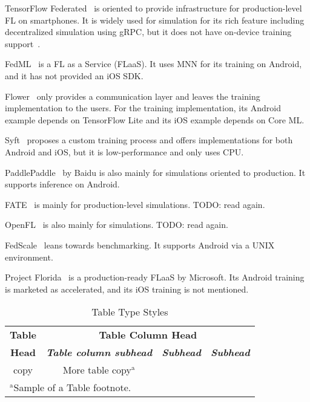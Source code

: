 \documentclass[conference]{IEEEtran}
\begin{document}
TensorFlow Federated~\cite{tensorflow2015-whitepaper} is oriented to
provide infrastructure for production-level FL on smartphones.
It is widely used for simulation for its rich feature including
decentralized simulation using gRPC,
but it does not have on-device training support~\cite{kholod2020open}.

FedML~\cite{he2020fedml} is a FL as a Service (FLaaS).
It uses MNN for its training on Android,
and it has not provided an iOS SDK.

Flower~\cite{beutel2020flower,mathur2021ondevice}
only provides a communication layer and
leaves the training implementation to the users.
For the training implementation,
its Android example depends on TensorFlow Lite and
its iOS example depends on Core ML.

Syft~\cite{ryffel2018generic,Ziller2021,hall2021syft}
proposes a custom training process and
offers implementations for both Android and iOS,
but it is low-performance and only uses CPU.

PaddlePaddle~\cite{ma2019paddlepaddle} by Baidu is
also mainly for simulations oriented to production.
It supports inference on Android.

FATE~\cite{liu2021fate} is mainly for production-level simulations.
TODO: read again.

OpenFL~\cite{patrick2022openfl} is also mainly for simulations.
TODO: read again.

FedScale~\cite{lai2022fedscale} leans towards benchmarking.
It supports Android via a UNIX environment.

Project Florida~\cite{madrigal2023project}
is a production-ready FLaaS by Microsoft.
Its Android training is marketed as accelerated,
and its iOS training is not mentioned.


\begin{table}[htbp]
\caption{Table Type Styles}
\begin{center}
\begin{tabular}{|c|c|c|c|}
\hline
\textbf{Table}&\multicolumn{3}{|c|}{\textbf{Table Column Head}} \\
\cline{2-4} 
\textbf{Head} & \textbf{\textit{Table column subhead}}& \textbf{\textit{Subhead}}& \textbf{\textit{Subhead}} \\
\hline
copy& More table copy$^{\mathrm{a}}$& &  \\
\hline
\multicolumn{4}{l}{$^{\mathrm{a}}$Sample of a Table footnote.}
\end{tabular}
\label{tab1}
\end{center}
\end{table}
\end{document}
